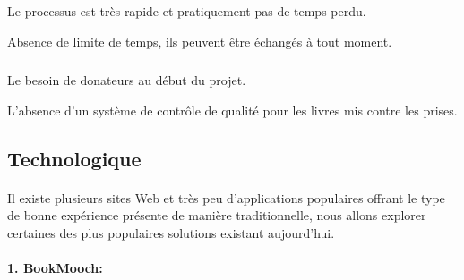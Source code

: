 \subparagraph*{}
\begin{list}{•}{\textbf{Avantages}}
\item Le processus est très rapide et pratiquement pas de temps perdu.
\item Absence de limite de temps, ils peuvent être échangés à tout moment.
\end{list}

\subparagraph*{}
\begin{list}{•}{\textbf{Inconvénients}}
\item Le besoin de donateurs au début du projet.
\item L'absence d'un système de contrôle de qualité pour les livres mis contre les prises.
\end{list}
\newpage

\subsection{Technologique}

\paragraph*{}
Il existe plusieurs sites Web et très peu d'applications populaires offrant le type de bonne expérience présente de manière traditionnelle, nous allons explorer certaines des plus populaires solutions existant aujourd’hui.\\

{\large \textbf{\\1. BookMooch:\\}}


